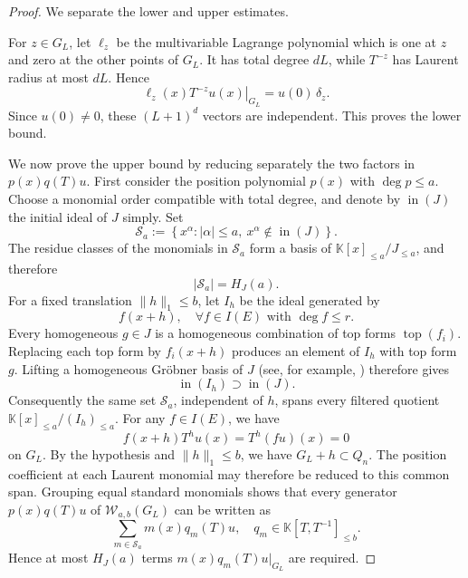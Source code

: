\documentclass[11pt,reqno]{amsart}
\newcommand\K{\ensuremath{\mathbb{K}}}
\theoremstyle{definition}
\theoremstyle{plain}
\numberwithin{equation}{section}
\begin{document}
\begin{proof}
We separate the lower and upper estimates.

For $z\in G_L$, let $\ell_z$ be the multivariable Lagrange polynomial which is
one at $z$ and zero at the other points of $G_L$.  It has total degree
$dL$, while $T^{-z}$ has Laurent radius at most $dL$.  Hence
\begin{equation*}
        \left.\ell_z(x)T^{-z}u(x)\right|_{G_L}
        =u(0)\,\delta_z.
\end{equation*}
Since $u(0)\neq 0$, these $(L+1)^d$ vectors are independent.  This
proves the lower bound.

We now prove the upper bound by reducing separately the two factors in
$p(x)q(T)u$. First consider the position polynomial $p(x)$ with $\deg p \le a$. Choose a monomial order compatible with total degree, and denote by $\operatorname{in}(J)$ the initial ideal of $J$ simply. Set
\[
    \mathcal S_a
    :=
    \left\{
        x^\alpha:
        |\alpha|\leq a,\ 
        x^\alpha\notin\operatorname{in}(J)
    \right\}.
\]
The residue classes of the monomials in $\mathcal S_a$ form a basis of
$\K[x]_{\leq a}/J_{\leq a}$, and therefore
\begin{equation*}
    |\mathcal S_a|=H_J(a).
\end{equation*}
For a fixed
translation $\|h\|_1\le b$, let $I_h$ be the ideal generated by
\begin{equation*}
        f(x+h),\quad \forall f\in I(E)\text{ with }\deg f\le r.
\end{equation*}
Every homogeneous $g\in J$ is a homogeneous combination of top forms
$\operatorname{top}(f_i)$.  Replacing each top form by $f_i(x+h)$ produces an element
of $I_h$ with top form $g$.  Lifting a homogeneous Gröbner basis of $J$ (see, for example, \cite[\S 2.2]{EneHerzog2012})
therefore gives
\begin{equation*}
        \operatorname{in}(I_h)\supset\operatorname{in}(J).
\end{equation*}
Consequently the same set $\mathcal S_a$, independent of $h$, spans
every filtered quotient $\K[x]_{\le a}/(I_h)_{\le a}$.  For any $f\in I(E)$, we have
\begin{equation*}
        f(x+h)T^hu(x)=T^h(fu)(x)=0
\end{equation*}
on $G_L$. By the hypothesis and $\|h\|_1\le b$, we have $G_L+h\subset Q_n$. The position
coefficient at each Laurent monomial may therefore be
reduced to this common span.  Grouping equal standard monomials shows
that every generator $p(x)q(T)u$ of $\mathcal{W}_{a,b}(G_L)$ can be written as
\begin{equation}\label{eq:required}
    \sum_{m\in \mathcal{S}_a}m(x)q_m(T)u,\quad q_m\in \K [T,T^{-1}]_{\le b}.
\end{equation}
Hence at most $H_J(a)$ terms $m(x)q_m(T)u|_{G_L}$ are required.


\end{proof}
\end{document}
